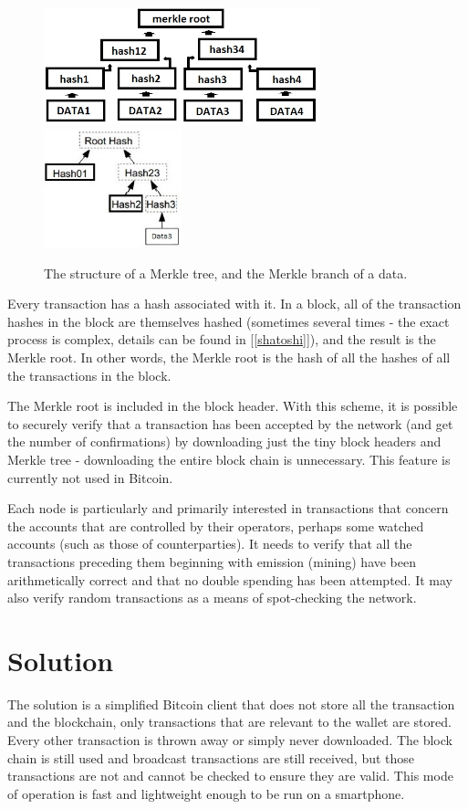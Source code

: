 \documentclass[a4paper,12pt]{article}
\begin{document}
\begin{figure}[h]\label{merkle}
\begin{center}
\includegraphics[width=8cm]{mroot.jpg}
\includegraphics[width=4cm]{branch.jpg}
\caption{The structure of a Merkle tree, and the Merkle branch of a data.}
\end{center}
\end{figure}
\vspace{-0.5cm}

Every transaction has a hash associated with it. In a block, all of the transaction hashes in the block are themselves hashed (sometimes several times - the exact process is complex, details can be found in [\ref{shatoshi}]), and the result is the Merkle root. In other words, the Merkle root is the hash of all the hashes of all the transactions in the block. 

The Merkle root is included in the block header. With this scheme, it is possible to securely verify that a transaction has been accepted by the network (and get the number of confirmations) by downloading just the tiny block headers and Merkle tree - downloading the entire block chain is unnecessary. This feature is currently not used in Bitcoin. 

Each node is particularly and primarily interested in transactions that concern the accounts that are controlled by their operators, perhaps some watched accounts (such as those of counterparties). It needs to verify that all the transactions preceding them beginning with emission (mining) have been arithmetically correct and that no double spending has been attempted. It may also verify random transactions as a means of
spot-checking the network.

\section{Solution}
The solution is a simplified Bitcoin client that does not store all the transaction and the blockchain, only transactions that are relevant to the wallet are stored. Every other transaction is thrown away or simply never downloaded. The block chain is still used and broadcast transactions are still received, but those transactions are not and cannot be checked to ensure they are valid. This mode of operation is fast and lightweight enough to be run on a smartphone.
\end{document}
